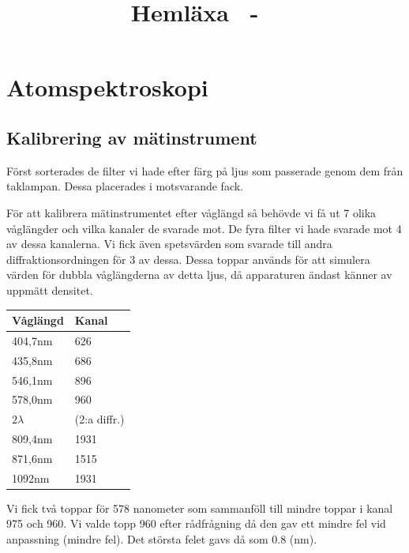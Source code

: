 \documentclass[a4paper,10pt]{article}
\title{Hemläxa \homeworknumber\ - \course\ \coursename}
\date{\thedate}
\author{\theauthor}
\begin{document}
\maketitle %
	\thispagestyle{empty}
\newpage %
\thispagestyle{empty}
\tableofcontents %
\newpage


\section{Atomspektroskopi}

\subsection{Kalibrering av mätinstrument}

Först sorterades de filter vi hade efter färg på ljus som passerade genom dem från taklampan. Dessa placerades i motsvarande fack.

För att kalibrera mätinstrumentet efter våglängd så behövde vi få ut 7 olika våglängder och vilka kanaler de svarade mot. De fyra filter vi hade svarade mot 4 av dessa kanalerna. Vi fick även spetsvärden som svarade till andra diffraktionsordningen för 3 av dessa. Dessa toppar används för att simulera värden för dubbla våglängderna av detta ljus, då apparaturen ändast känner av uppmätt densitet.

\begin{center}
\begin{tabular}[c]{|l|l|}
	\hline
	Våglängd & Kanal \\
	\hline
	404,7nm & 626 \\
	435,8nm & 686 \\
	546,1nm & 896 \\
	578,0nm & 960 \\
	\hline
	$2\lambda$ & (2:a diffr.) \\
	\hline
	809,4nm & 1931 \\
	871,6nm & 1515 \\
	1092nm & 1931 \\
	\hline
\end {tabular}
\end {center}
\vspace{10pt}

Vi fick två toppar för 578 nanometer som sammanföll till mindre toppar i kanal 975 och 960. Vi valde topp 960 efter rådfrågning då den gav ett mindre fel vid anpassning (mindre fel). Det största felet gavs då som 0.8 (nm).
\end{document}
